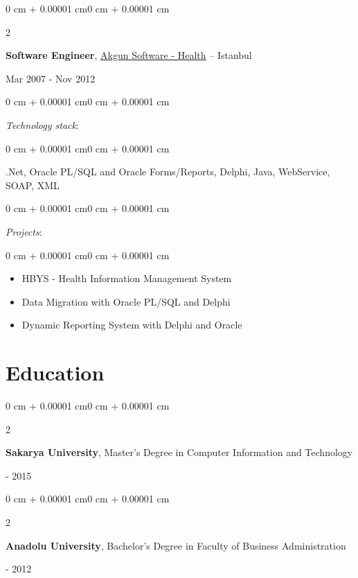 \documentclass[10pt, letterpaper]{article}
\newenvironment{highlights}{
    \begin{itemize}[
        topsep=0.10 cm,
        parsep=0.10 cm,
        partopsep=0pt,
        itemsep=0pt,
        leftmargin=0 cm + 10pt]
}{
    \end{itemize}} %
\newenvironment{onecolentry}{
    \begin{adjustwidth}{0 cm + 0.00001 cm}{0 cm + 0.00001 cm}
}{
    \end{adjustwidth}}
\newenvironment{twocolentry}[2][]{
    \onecolentry
    \def\secondColumn{#2}
    \setcolumnwidth{\fill, 4.5 cm}
    \begin{paracol}{2}
}{
    \switchcolumn \raggedleft \secondColumn
    \end{paracol}
    \endonecolentry
} %
\begin{document}
        \begin{twocolentry}{Mar 2007 - Nov 2012}
            \textbf{Software Engineer}, \href{https://www.akgun.com.tr/}{Akgun Software - Health} -- Istanbul
        \end{twocolentry}
            \begin{onecolentry}
                \textit{Technology stack}:
            \end{onecolentry}
            \begin{onecolentry}
                \begin{highlights}
                    .Net, Oracle PL/SQL and Oracle Forms/Reports, Delphi, Java, WebService, SOAP, XML
                \end{highlights}
            \end{onecolentry}
            \vspace{0.2 cm}
            \begin{onecolentry}
                \textit{Projects}:
            \end{onecolentry}
            \begin{onecolentry}
                \begin{highlights}
                    \item HBYS - Health Information Management System
                    \item Data Migration with Oracle PL/SQL and Delphi
                    \item Dynamic Reporting System with Delphi and Oracle
                \end{highlights}
            \end{onecolentry}
            \vspace{0.5 cm}


    \section{Education}
        \begin{twocolentry}{2013 - 2015}
            \textbf{Sakarya University}, Master's Degree in Computer Information and Technology
        \end{twocolentry}

        \vspace{0.10 cm}
        \begin{twocolentry}{2006 - 2012}
            \textbf{Anadolu University}, Bachelor's Degree in Faculty of Business Administration
        \end{twocolentry}
\end{document}
